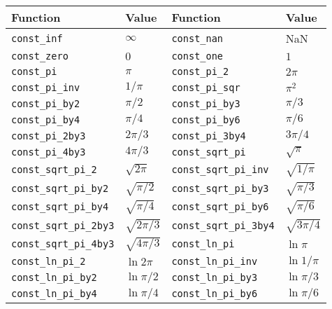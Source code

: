 \begin{table}
  \begin{tabularx}{\textwidth}{p{1.5in}Lp{1.5in}L}
    \toprule
    Function & Value & Function & Value \\
    \midrule
    \texttt{const\_inf}            & $\infty$        &
    \texttt{const\_nan}            & NaN             \\
    \texttt{const\_zero}           & $0$             &
    \texttt{const\_one}            & $1$             \\
    \texttt{const\_pi}             & $\pi$           &
    \texttt{const\_pi\_2}          & $2\pi$          \\
    \texttt{const\_pi\_inv}        & $1/\pi$         &
    \texttt{const\_pi\_sqr}        & $\pi^2$         \\
    \texttt{const\_pi\_by2}        & $\pi/2$         &
    \texttt{const\_pi\_by3}        & $\pi/3$         \\
    \texttt{const\_pi\_by4}        & $\pi/4$         &
    \texttt{const\_pi\_by6}        & $\pi/6$         \\
    \texttt{const\_pi\_2by3}       & $2\pi/3$        &
    \texttt{const\_pi\_3by4}       & $3\pi/4$        \\
    \texttt{const\_pi\_4by3}       & $4\pi/3$        &
    \texttt{const\_sqrt\_pi}       & $\sqrt{\pi}$    \\
    \texttt{const\_sqrt\_pi\_2}    & $\sqrt{2\pi}$   &
    \texttt{const\_sqrt\_pi\_inv}  & $\sqrt{1/\pi}$  \\
    \texttt{const\_sqrt\_pi\_by2}  & $\sqrt{\pi/2}$  &
    \texttt{const\_sqrt\_pi\_by3}  & $\sqrt{\pi/3}$  \\
    \texttt{const\_sqrt\_pi\_by4}  & $\sqrt{\pi/4}$  &
    \texttt{const\_sqrt\_pi\_by6}  & $\sqrt{\pi/6}$  \\
    \texttt{const\_sqrt\_pi\_2by3} & $\sqrt{2\pi/3}$ &
    \texttt{const\_sqrt\_pi\_3by4} & $\sqrt{3\pi/4}$ \\
    \texttt{const\_sqrt\_pi\_4by3} & $\sqrt{4\pi/3}$ &
    \texttt{const\_ln\_pi}         & $\ln{\pi}$      \\
    \texttt{const\_ln\_pi\_2}      & $\ln{2\pi}$     &
    \texttt{const\_ln\_pi\_inv}    & $\ln{1/\pi}$    \\
    \texttt{const\_ln\_pi\_by2}    & $\ln{\pi/2}$    &
    \texttt{const\_ln\_pi\_by3}    & $\ln{\pi/3}$    \\
    \texttt{const\_ln\_pi\_by4}    & $\ln{\pi/4}$    &
    \texttt{const\_ln\_pi\_by6}    & $\ln{\pi/6}$    \\

\end{tabularx}
\end{table}
